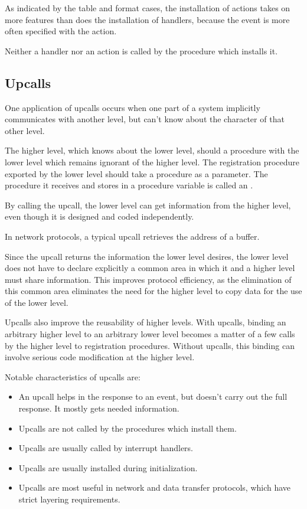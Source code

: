 As indicated by the table and format cases, the installation of actions
takes on more features than does the installation of handlers, because
the event is more often specified with the action.

Neither a handler nor an action is called by the procedure which installs it.

\subsection{Upcalls}

One application of upcalls occurs when one part of a system implicitly 
communicates with another
level, but can't know about the character of that other level.

The higher level, which knows about the lower level, should 
a procedure with the lower level which remains ignorant of the higher level.
The registration procedure exported by the lower level should take a procedure
as a parameter.  The procedure it receives and stores in a procedure
variable is called an . 

By calling the upcall, the lower level can get information from the higher level, even though it is designed and coded independently.

In network protocols, a typical upcall retrieves the address of a buffer.

Since the upcall returns the information the lower level desires, the lower
level does not have to declare explicitly a common area in which it and a higher
level must share information.  This improves protocol efficiency, as the 
elimination of this common area eliminates the need for the higher level to
copy data for the use of the lower level.

Upcalls also improve the reusability of higher levels.  With upcalls, binding  
an arbitrary higher level to an arbitrary lower level
becomes a matter of a few calls by the higher level to registration procedures.
Without upcalls, this binding can involve serious code modification at the 
higher
level.

Notable characteristics of upcalls are:
\begin{itemize}
 \item
   An upcall helps in the response to an event, but doesn't carry out the
   full response.  It mostly gets needed information.
 \item
   Upcalls are not called by the procedures which install them.
 \item
   Upcalls are usually called by interrupt handlers.
\item
   Upcalls are usually installed during initialization.
 \item
   Upcalls are most useful in network and data transfer protocols, which
   have strict layering requirements.
\end{itemize}

